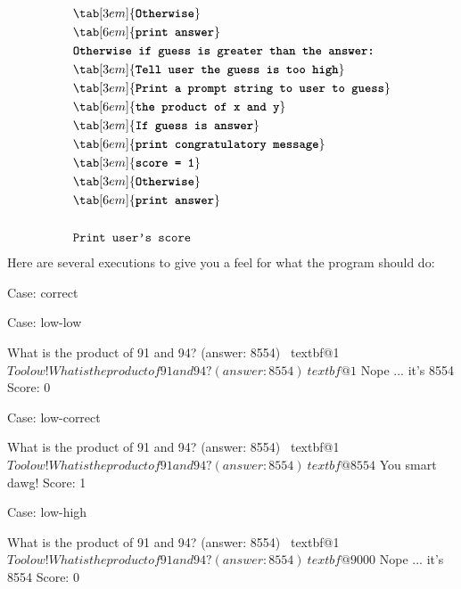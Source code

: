 \begin{align*}
&\tab[3em]{\textbf{\texttt{Otherwise}}}\\
&\tab[6em]{\textbf{\texttt{print answer}}}\\
&\textbf{\texttt{Otherwise if guess is greater than the answer:}}\\
&\tab[3em]{\textbf{\texttt{Tell user the guess is too high}}}\\
&\tab[3em]{\textbf{\texttt{Print a prompt string to user to guess}}}\\
&\tab[6em]{\textbf{\texttt{the product of x and y}}}\\
&\tab[3em]{\textbf{\texttt{If guess is answer}}}\\
&\tab[6em]{\textbf{\texttt{print congratulatory message}}}\\
&\tab[3em]{\textbf{\texttt{score = 1}}}\\
&\tab[3em]{\textbf{\texttt{Otherwise}}}\\
&\tab[6em]{\textbf{\texttt{print answer}}}\\\\
&\texttt{Print user's score}\\
\end{align*}
Here are several executions to give you a feel for what the program
should do:

Case: correct\\

Case: low-low\\
\begin{console}[commandchars=\~\@\$]
What is the product of 91 and 94? (answer: 8554) ~textbf@1$
Too low!
What is the product of 91 and 94? (answer: 8554) ~textbf@1$
Nope ... it's 8554
Score: 0 
\end{console}

Case: low-correct\\
\begin{console}[commandchars=\~\@\$]
What is the product of 91 and 94? (answer: 8554) ~textbf@1$
Too low!
What is the product of 91 and 94? (answer: 8554) ~textbf@8554$
You smart dawg!
Score: 1 
\end{console}

Case: low-high\\
\begin{console}[commandchars=\~\@\$]
What is the product of 91 and 94? (answer: 8554) ~textbf@1$
Too low!
What is the product of 91 and 94? (answer: 8554) ~textbf@9000$
Nope ... it's 8554
Score: 0
\end{console}

